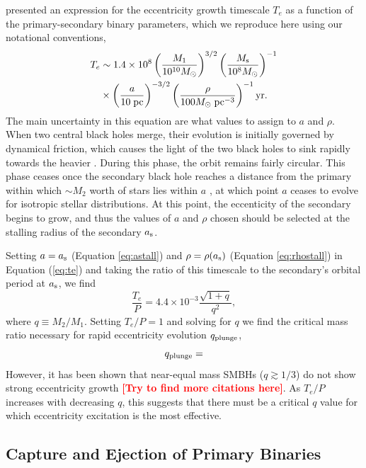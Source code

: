 \documentclass[a4paper,twocolumn]{emulateapj}
\newcommand{\colr}[1]{{\bf \textcolor{red}{[#1]}}}
\begin{document}
\citet{Iwasawa:2011a} presented an expression for the eccentricity growth timescale $T_{e}$ as a function of the primary-secondary binary parameters, which we reproduce here using our notational conventions,
\begin{align}
T_{e} &\sim 1.4 \times 10^{8} \left(\frac{M_{1}}{10^{10} M_{\odot}}\right)^{3/2}\left(\frac{M_{\rm s}}{10^{8} M_{\odot}}\right)^{-1}\nonumber\\
&\times \left(\frac{a}{10\;{\rm pc}}\right)^{-3/2}\left(\frac{\rho}{100 M_{\odot}\;{\rm pc}^{-3}}\right)^{-1} {\rm yr}.
\label{eq:te}
\end{align}
The main uncertainty in this equation are what values to assign to $a$ and $\rho$. When two central black holes merge, their evolution is initially governed by dynamical friction, which causes the light of the two black holes to sink rapidly towards the heavier \citep{Dotti:2012a}. During this phase, the orbit remains fairly circular. This phase ceases once the secondary black hole reaches a distance from the primary within which $\sim M_{2}$ worth of stars lies within $a$ \citep{Matsubayashi:2007a}, at which point $a$ ceases to evolve for isotropic stellar distributions. At this point, the eccenticity of the secondary begins to grow, and thus the values of $a$ and $\rho$ chosen should be selected at the stalling radius of the secondary $a_{\rm s}$.

Setting $a = a_{\rm s}$ (Equation \ref{eq:astall}) and $\rho = \rho(a_{\rm s})$ (Equation \ref{eq:rhostall}) in Equation (\ref{eq:te}) and taking the ratio of this timescale to the secondary's orbital period at $a_{\rm s}$, we find
\begin{equation}
\frac{T_{e}}{P} = 4.4 \times 10^{-3} \frac{\sqrt{1 + q}}{q^{2}},
\end{equation}
where $q \equiv M_{2}/M_{1}$. Setting $T_{e}/P = 1$ and solving for $q$ we find the critical mass ratio necessary for rapid eccentricity evolution $q_{\rm plunge}$,
\begin{equation}
q_{\rm plunge} = \label{eq:qplunge}
\end{equation}
However, it has been shown that near-equal mass SMBHs ($q \gtrsim 1/3$) do not show strong eccentricity growth \citep{Sesana:2010a} \colr{Try to find more citations here}. As $T_{e}/P$ increases with decreasing $q$, this suggests that there must be a critical $q$ value for which eccentricity excitation is the most effective.

\subsection{Capture and Ejection of Primary Binaries}
\end{document}
